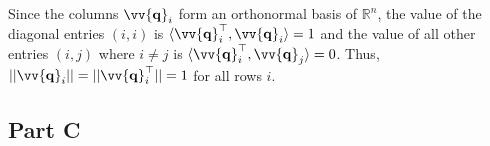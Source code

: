 \documentclass[12pt]{article}
\newcommand{\vect}[1]{\vv{\mathbf{#1}}}
\newcommand{\R}{\mathbb{R}}
\begin{document}
Since the columns $\vect{q}_i$ form an orthonormal basis of $\R^n$, the value of the diagonal entries $(i,i)$ is $\langle\vect{q}_i^\top, \vect{q}_i\rangle=1$ and the value of all other entries $(i,j)$ where $i\neq j$ is $\langle\vect{q}_i^\top, \vect{q}_j\rangle=0$. Thus, $||\vect{q}_i||=||\vect{q}_i^\top||=1$ for all rows $i$.


\subsection*{Part C}
\end{document}
